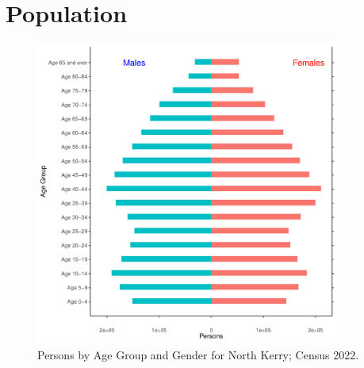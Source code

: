 \documentclass{article}
\begin{document}
\pagebreak

\section{Population} 
\label{sect:Pop}

\begin{figure}[h]
	\centering
	\includegraphics[width = 100mm]{../figures/PyramidPlot.pdf}
	\caption{Persons by Age Group and Gender for North Kerry; Census 2022.}
	\label{fig:2ae19629-1a6a-13a3-e055-000000000001}
	\end{figure}
\end{document}
